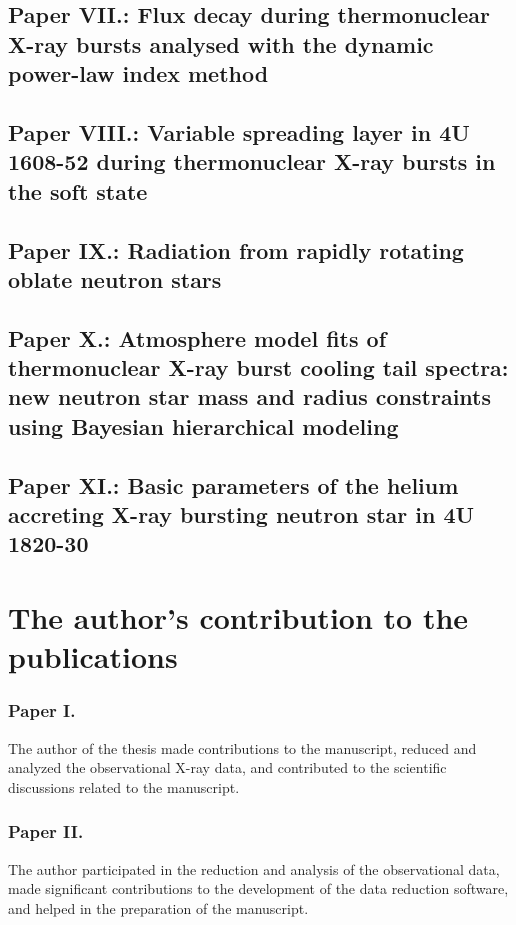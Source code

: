 \subsection*{Paper VII.: Flux decay during thermonuclear X-ray bursts analysed with the dynamic power-law index method}


\subsection*{Paper VIII.: Variable spreading layer in 4U 1608-52 during thermonuclear X-ray bursts in the soft state}


\subsection*{Paper IX.: Radiation from rapidly rotating oblate neutron stars}

\subsection*{Paper X.: Atmosphere model fits of thermonuclear X-ray burst cooling tail spectra: new neutron star mass and radius constraints using Bayesian hierarchical modeling}

\subsection*{Paper XI.: Basic parameters of the helium accreting X-ray bursting neutron star in 4U 1820-30}


\section{The author's contribution to the publications} 

\subsubsection*{Paper I.}
The author of the thesis made contributions to the manuscript, reduced and analyzed the observational X-ray data, and contributed to the scientific discussions related to the manuscript.


\subsubsection*{Paper II.}
The author participated in the reduction and analysis of the observational data, made significant contributions to the development of the data reduction software, and helped in the preparation of the manuscript.


